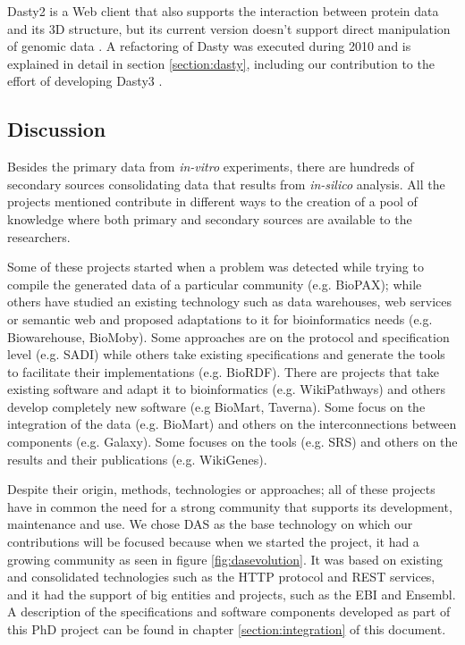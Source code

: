 Dasty2 is a Web client that also supports the interaction between protein data and its 3D structure, but its current version doesn't support direct manipulation of genomic data \cite{JIM2008}. A refactoring of Dasty was executed during 2010 and is explained in detail in section \ref{section:dasty}, including our contribution to the effort of developing Dasty3 \cite{VIL2011}. 

\subsection{Discussion}
Besides the primary data from \emph{in-vitro} experiments, there are hundreds of secondary sources consolidating data that results from \emph{in-silico} analysis. All the projects mentioned contribute in different ways to the creation of a pool of knowledge where both primary and secondary sources are available to the researchers.

Some of these projects started when a problem was detected while trying to compile the generated data of a particular community (e.g. BioPAX); while others have studied an existing technology such as data warehouses, web services or semantic web and proposed adaptations to it for bioinformatics needs (e.g. Biowarehouse, BioMoby). Some approaches are on the protocol and specification level (e.g. SADI) while others take existing specifications and generate the tools to facilitate their implementations (e.g. BioRDF). There are projects that take existing software and adapt it to bioinformatics (e.g. WikiPathways) and others develop completely new software (e.g BioMart, Taverna). Some focus on the integration of the data (e.g. BioMart) and others on the interconnections between components (e.g. Galaxy). Some focuses on the tools (e.g. SRS) and others on the results and their publications (e.g. WikiGenes). 

Despite their origin, methods, technologies or approaches; all of these projects have in common the need for a strong community that supports its development, maintenance and use. We chose DAS as the base technology on which our contributions will be focused because when we started the project, it had a growing community as seen in figure \ref{fig:dasevolution}. It was based on existing and consolidated technologies such as the HTTP protocol and REST services, and it had the support of big entities and projects, such as the EBI and Ensembl. A description of the specifications and software components developed as part of this PhD project can be found in chapter \ref{section:integration} of this document.

